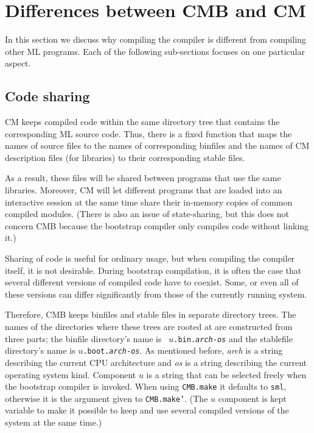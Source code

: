 %

\section{Differences between CMB and CM}

In this section we discuss why compiling the compiler is different
from compiling other ML programs.  Each of the following sub-sections
focuses on one particular aspect.

\subsection{Code sharing}

CM keeps compiled code within the same directory tree that contains
the corresponding ML source code.  Thus, there is a fixed function
that maps the names of source files to the names of corresponding
binfiles and the names of CM description files (for libraries) to
their corresponding stable files.

As a result, these files will be shared between programs that use the
same libraries.  Moreover, CM will let different programs that are
loaded into an interactive session at the same time share their
in-memory copies of common compiled modules.  (There is also an issue of
state-sharing, but this does not concern CMB because the bootstrap
compiler only compiles code without linking it.)

Sharing of code is useful for ordinary usage, but when compiling the
compiler itself, it is not desirable.  During bootstrap compilation,
it is often the case that several different versions of compiled code
have to coexist.  Some, or even all of these versions can differ
significantly from those of the currently running system.

Therefore, CMB keeps binfiles and stable files in separate directory
trees.  The names of the directories where these trees are rooted at
are constructed from three parts; the binfile directory's name is {\tt
$u$.bin.{\it arch}-{\it os}} and the stablefile directory's name is
{\tt $u$.boot.{\it arch}-{\it os}}.  As mentioned before, {\it arch}
is a string describing the current CPU architecture and {\it os} is a
string describing the current operating system kind. Component $u$ is
a string that can be selected freely when the bootstrap compiler is
invoked.  When using {\tt CMB.make} it defaults to {\tt sml},
otherwise it is the argument given to {\tt CMB.make'}.  (The $u$
component is kept variable to make it possible to keep and use several
compiled versions of the system at the same time.)


